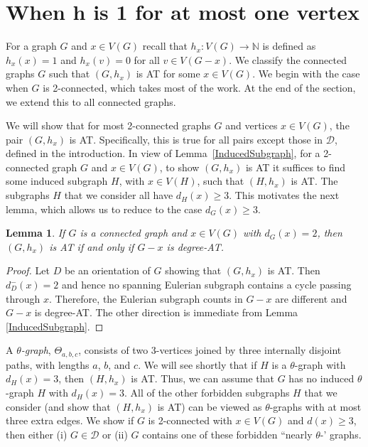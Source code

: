 \documentclass[12pt]{article}
\theoremstyle{plain}
\newtheorem{lem}[thm]{Lemma}
\theoremstyle{definition}
\theoremstyle{remark}
\newcommand{\fancy}[1]{\mathcal{#1}}
\newcommand{\IN}{\mathbb{N}}
\newcommand{\D}{\fancy{D}}
\newcommand{\func}[3]{#1\colon #2 \rightarrow #3}
\def\D{\fancy{D}}
\begin{document}
\section{When h is 1 for at most one vertex}
\label{MainThmSec}
For a graph $G$ and $x \in V(G)$ recall that $\func{h_x}{V(G)}{\IN}$ is defined
as $h_x(x) = 1$ and $h_x(v) = 0$ for all $v \in V(G-x)$. We classify the
connected 
graphs $G$ such that $(G,h_x)$ is AT for some $x \in V(G)$. 
We begin with the case when $G$ is 2-connected, which takes most of the work.
At the end of the section, we extend this to all connected graphs.

We will show that for most 2-connected graphs $G$ and vertices $x\in V(G)$, the
pair $(G,h_x)$ is AT.  Specifically, this is true for all pairs except those in
$\D$, defined in the introduction.  In view of Lemma~\ref{InducedSubgraph}, for
a 2-connected graph $G$ and $x\in V(G)$, to show $(G,h_x)$ is AT it suffices to
find some induced subgraph $H$, with $x\in V(H)$, such that $(H,h_x)$ is AT. 
The subgraphs $H$ that we consider all have $d_H(x)\ge 3$.  This motivates the
next lemma, which allows us to reduce to the case $d_G(x)\ge 3$.

\begin{lem}\label{DegreeTwoVertex}
If $G$ is a connected graph and $x \in V(G)$ with $d_G(x) = 2$, then $(G,h_x)$
is AT if and only if $G-x$ is degree-AT.
\end{lem}
\begin{proof}
Let $D$ be an orientation of $G$ showing that $(G,h_x)$ is AT.  Then
$d_{D}^-(x) = 2$ and hence no spanning Eulerian subgraph contains a cycle
passing through $x$.  Therefore, the Eulerian subgraph counts in $G-x$ are
different and $G-x$ is degree-AT.  The other direction is immediate from Lemma
\ref{InducedSubgraph}.
\end{proof}

A \emph{$\theta$-graph}, $\Theta_{a,b,c}$, consists of two 3-vertices joined by
three internally disjoint paths, with lengths $a$, $b$, and $c$.  We will see
shortly that if $H$ is a $\theta$-graph with $d_H(x)=3$, then $(H,h_x)$ is AT.
Thus, we can assume that $G$ has no induced $\theta$-graph $H$ with $d_H(x)=3$. 
All of the other
forbidden subgraphs $H$ that we consider (and show that $(H,h_x)$ is AT) can be
viewed as $\theta$-graphs with at most three extra edges.  We show if $G$ is
2-connected with $x\in V(G)$ and $d(x)\ge 3$, then either (i) $G\in \D$ or (ii)
$G$ contains one of these forbidden ``nearly $\theta$-' graphs.
\end{document}
